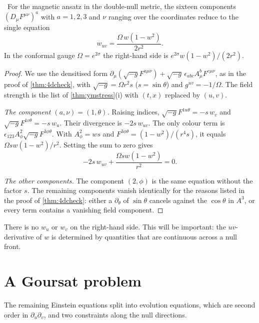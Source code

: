 \begin{theorem}\label{thm:ymnull}\ver\
For the magnetic ansatz in the double-null metric, the sixteen components $(D_\mu F^{\mu\nu})^a$ with $a=1,2,3$ and $\nu$ ranging over the coordinates reduce to the single equation
\[
w_{uv}=\frac{\Omega\,w(1-w^2)}{2r^2}.
\]
In the conformal gauge $\Omega=e^{2\sigma}$ the right-hand side is $e^{2\sigma}w(1-w^2)/(2r^2)$.
\end{theorem}
\begin{proof}
We use the densitised form $\partial_\mu(\sqrt{-g}F^{a\mu\nu})+\sqrt{-g}\,\epsilon_{abc}A^b_\mu F^{c\mu\nu}$, as in the proof of \cref{thm:4dcheck}, with $\sqrt{-g}=\Omega r^2s$ ($s=\sin\theta$) and $g^{uv}=-1/\Omega$. The field strength is the list of \cref{thm:ymstress}(i) with $(t,x)$ replaced by $(u,v)$.

\emph{The component $(a,\nu)=(1,\theta)$.} Raising indices, $\sqrt{-g}F^{1u\theta}=-s\,w_v$ and $\sqrt{-g}F^{1v\theta}=-s\,w_u$. Their divergence is $-2s\,w_{uv}$. The only colour term is $\epsilon_{123}A^2_\phi\sqrt{-g}F^{3\phi\theta}$. With $A^2_\phi=ws$ and $F^{3\phi\theta}=(1-w^2)/(r^4s)$, it equals $\Omega sw(1-w^2)/r^2$. Setting the sum to zero gives
\[
-2s\,w_{uv}+\frac{\Omega sw(1-w^2)}{r^2}=0 .
\]

\emph{The other components.} The component $(2,\phi)$ is the same equation without the factor $s$. The remaining components vanish identically for the reasons listed in the proof of \cref{thm:4dcheck}: either a $\partial_\theta$ of $\sin\theta$ cancels against the $\cos\theta$ in $A^3$, or every term contains a vanishing field component.
\end{proof}


There is no $w_u$ or $w_v$ on the right-hand side. This will be important: the $uv$-derivative of $w$ is determined by quantities that are continuous across a null front.

\section{A Goursat problem}

The remaining Einstein equations split into evolution equations, which are second order in $\partial_u\partial_v$, and two constraints along the null directions.

